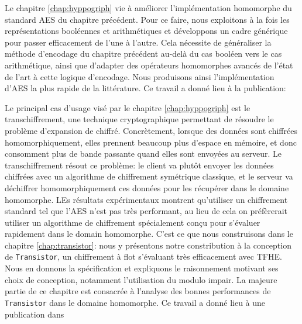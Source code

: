 \begin{center}
\end{center}

Le chapitre \ref{chap:hyppogriph} vie à améliorer l'implémentation homomorphe du standard AES du chapitre précédent. Pour ce faire, nous exploitons à la fois les représentations booléennes et arithmétiques et développons un cadre générique pour passer efficacement de l’une à l’autre. Cela nécessite de généraliser la méthode d’encodage du chapitre précédent au-delà du cas booléen vers le cas arithmétique, ainsi que d'adapter des opérateurs homomorphes avancés de l'état de l'art à cette logique d'encodage. Nous produisons ainsi l'implémentation d’AES la plus rapide de la littérature.
Ce travail a donné lieu à la publication:

\begin{center}
\end{center}

Le principal cas d'usage visé par le chapitre \ref{chap:hyppogriph} est le transchiffrement, une technique cryptographique permettant de résoudre le problème d'expansion de chiffré. Concrètement, lorsque des données sont chiffrées homomorphiquement, elles prennent beaucoup plus d'espace en mémoire, et donc consomment plus de bande passante quand elles sont envoyées au serveur. Le transchiffrement résout ce problème: le client va plutôt envoyer les données chiffrées avec un algorithme de chiffrement symétrique classique, et le serveur va déchiffrer homomorphiquement ces données pour les récupérer dans le domaine homomorphe. LEs résultats expérimentaux montrent qu'utiliser un chiffrement standard tel que l'AES n'est pas très performant, au lieu de cela on préfèrerait utiliser un algorithme de chiffrement spécialement conçu pour s'évaluer rapidement dans le domain homomorphe. C'est ce que nous construisons dans le chapitre \ref{chap:transistor}: nous y présentons notre constribution à la conception de \texttt{Transistor}, un chiffrement à flot s'évaluant très efficacement avec TFHE.  Nous en donnons la spécification et expliquons le raisonnement motivant ses choix de conception, notamment l'utilisation du modulo impair. La majeure partie de ce chapitre est consacrée à l’analyse des bonnes performances de \texttt{Transistor} dans le domaine homomorphe.
Ce travail a donné lieu à une publication dans

\begin{center}
\end{center}

